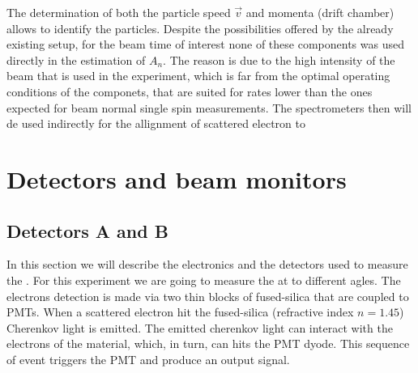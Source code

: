 The determination of both the particle speed $\vec{v}$ and momenta (drift chamber) allows to identify the particles. Despite the possibilities offered by the already existing setup, for the beam time of interest none of these components was used directly in the estimation of $A_{n}$. The reason is due to the high intensity of the beam that is used in the experiment, which is far from the optimal operating conditions of the componets, that are suited for rates lower than the ones expected for beam normal single spin measurements. The spectrometers then will de used indirectly for the allignment of scattered electron to

\section{Detectors and beam monitors}

\subsection{Detectors A and B}


In this section we will describe the electronics and the detectors used to measure the \transv .
For this experiment we are going to measure the \transv at to different agles. The electrons detection is 
made via two thin blocks of fused-silica that are coupled to PMTs. When a scattered electron hit the fused-silica (refractive index $n = 1.45$) Cherenkov light is emitted. The emitted cherenkov light can interact with the electrons of the material, which, in turn, can hits the PMT dyode. This sequence of event triggers the PMT and produce an output signal.

